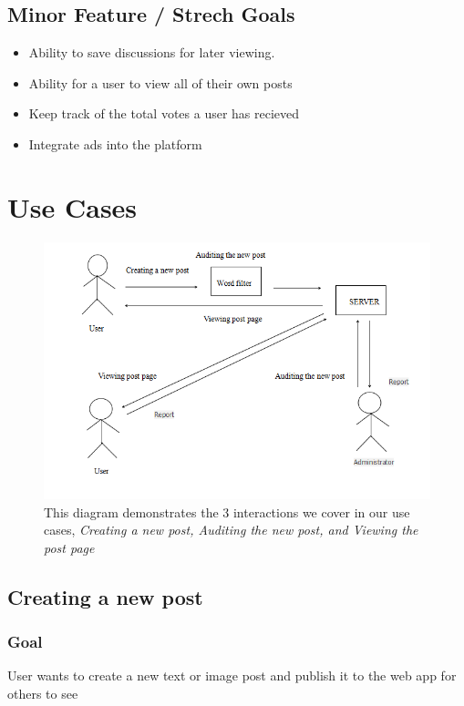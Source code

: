 \documentclass[12pt]{article}
\begin{document}
\subsection{Minor Feature / Strech Goals}
\begin{itemize}
      \item Ability to save discussions for later viewing.
      \item Ability for a user to view all of their own posts
      \item Keep track of the total votes a user has recieved
      \item Integrate ads into the platform
\end{itemize}


\section{Use Cases}

\begin{figure}
  \includegraphics[scale=0.75]{use_case_diagram}
  \caption{This diagram demonstrates the 3 interactions we cover in our use cases, \textit{Creating a new post, Auditing the new post, and Viewing the post page}}
\end{figure}

\subsection{Creating a new post}

\subsubsection{Goal}
User wants to create a new text or image post and publish it to the web app for others to see
\end{document}
